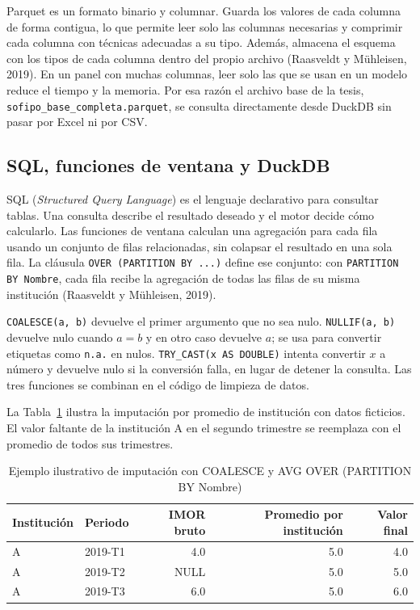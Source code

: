 Parquet es un formato binario y columnar. Guarda los valores de cada columna de forma contigua, lo que permite leer solo las columnas necesarias y comprimir cada columna con técnicas adecuadas a su tipo. Además, almacena el esquema con los tipos de cada columna dentro del propio archivo (Raasveldt y Mühleisen, 2019). En un panel con muchas columnas, leer solo las que se usan en un modelo reduce el tiempo y la memoria. Por esa razón el archivo base de la tesis, \texttt{sofipo\_base\_completa.parquet}, se consulta directamente desde DuckDB sin pasar por Excel ni por CSV. %

\subsection{SQL, funciones de ventana y DuckDB}
SQL (\textit{Structured Query Language}) es el lenguaje declarativo para consultar tablas. Una consulta describe el resultado deseado y el motor decide cómo calcularlo. Las funciones de ventana calculan una agregación para cada fila usando un conjunto de filas relacionadas, sin colapsar el resultado en una sola fila. La cláusula \texttt{OVER (PARTITION BY ...)} define ese conjunto: con \texttt{PARTITION BY Nombre}, cada fila recibe la agregación de todas las filas de su misma institución (Raasveldt y Mühleisen, 2019).

\texttt{COALESCE(a, b)} devuelve el primer argumento que no sea nulo. \texttt{NULLIF(a, b)} devuelve nulo cuando $a=b$ y en otro caso devuelve $a$; se usa para convertir etiquetas como \texttt{n.a.} en nulos. \texttt{TRY\_CAST(x AS DOUBLE)} intenta convertir $x$ a número y devuelve nulo si la conversión falla, en lugar de detener la consulta. Las tres funciones se combinan en el código de limpieza de datos.

La Tabla~\ref{tab:sql_ejemplo} ilustra la imputación por promedio de institución con datos ficticios. El valor faltante de la institución A en el segundo trimestre se reemplaza con el promedio de todos sus trimestres.

\begin{table}[htbp]
\centering
\small
\caption{Ejemplo ilustrativo de imputación con COALESCE y AVG OVER (PARTITION BY Nombre)}
\label{tab:sql_ejemplo}
\begin{tabular}{llrrr}
\toprule
Institución & Periodo & IMOR bruto & Promedio por institución & Valor final \\
\midrule
A & 2019-T1 & 4.0 & 5.0 & 4.0 \\
A & 2019-T2 & NULL & 5.0 & 5.0 \\
A & 2019-T3 & 6.0 & 5.0 & 6.0 \\
\bottomrule
\end{tabular}
\end{table}

